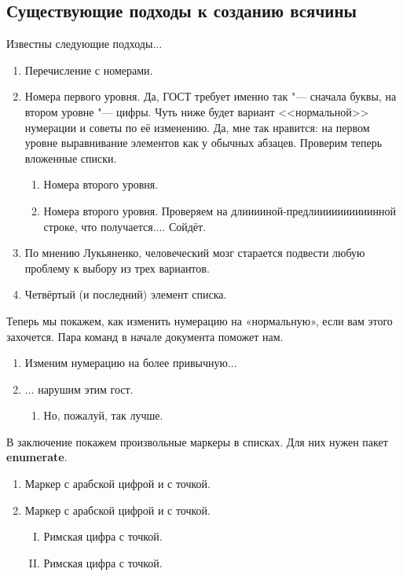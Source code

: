 \subsection{Существующие подходы к созданию всячины}

Известны следующие подходы...

\begin{enumerate}
  \item Перечисление с номерами.
  \item Номера первого уровня. Да, ГОСТ требует именно так "--- сначала буквы, на втором уровне "--- цифры.
        Чуть ниже будет вариант <<нормальной>> нумерации и советы по её изменению.
        Да, мне так нравится: на первом уровне выравнивание элементов как у обычных абзацев. Проверим теперь вложенные списки.
        \begin{enumerate}
          \item Номера второго уровня.
          \item Номера второго уровня. Проверяем на длииииной-предлиииииииииинной строке, что получается.... Сойдёт.
        \end{enumerate}
  \item По мнению Лукьяненко, человеческий мозг старается подвести любую проблему к выбору
        из трех вариантов.
  \item Четвёртый (и последний) элемент списка.
\end{enumerate}

Теперь мы покажем, как изменить нумерацию на «нормальную», если вам этого захочется. Пара команд в начале документа поможет нам.

\renewcommand{\labelenumi}{\arabic{enumi})}
\renewcommand{\labelenumii}{\asbuk{enumii})}

\begin{enumerate}
  \item Изменим нумерацию на более привычную...
  \item ... нарушим этим гост.
        \begin{enumerate}
          \item Но, пожалуй, так лучше.
        \end{enumerate}
\end{enumerate}

В заключение покажем произвольные маркеры в списках. Для них нужен пакет \textbf{enumerate}.
\begin{enumerate}[1.]
  \item Маркер с арабской цифрой и с точкой.
  \item Маркер с арабской цифрой и с точкой.
        \begin{enumerate}[I.]
          \item Римская цифра с точкой.
          \item Римская цифра с точкой.
        \end{enumerate}
\end{enumerate}


